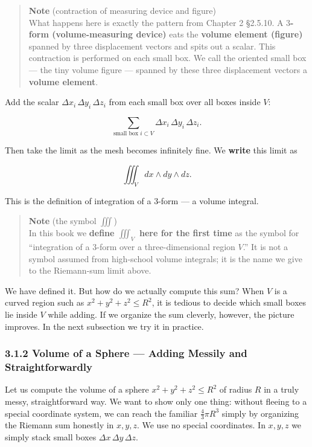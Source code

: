 \begin{quote}
\textbf{Note} (contraction of measuring device and figure)\\
What happens here is exactly the pattern from Chapter 2 §2.5.10. A
\textbf{$3$-form (volume-measuring device)} eats the
\textbf{volume element (figure)} spanned by three displacement vectors
and spits out a scalar. This contraction is performed on each small box.
We call the oriented small box --- the tiny volume figure --- spanned by
these three displacement vectors a \textbf{volume element}.
\end{quote}

Add the scalar \(\Delta x_i\,\Delta y_i\,\Delta z_i\) from each small
box over all boxes inside \(V\):

\[\sum_{\text{small box }i \subset V} \Delta x_i\,\Delta y_i\,\Delta z_i.\]

Then take the limit as the mesh becomes infinitely fine. We
\textbf{write} this limit as

\[\iiint_V dx \wedge dy \wedge dz.\]

This is the definition of integration of a \(3\)-form --- a volume
integral.

\begin{quote}
\textbf{Note} (the symbol \(\iiint\))\\
In this book we \textbf{define $\iiint_V$ here for the first time} as
the symbol for ``integration of a \(3\)-form over a three-dimensional
region \(V\).'' It is not a symbol assumed from high-school volume
integrals; it is the name we give to the Riemann-sum limit above.
\end{quote}

We have defined it. But how do we actually compute this sum? When \(V\)
is a curved region such as \(x^2+y^2+z^2 \le R^2\), it is tedious to
decide which small boxes lie inside \(V\) while adding. If we organize
the sum cleverly, however, the picture improves. In the next subsection
we try it in practice.

\hypertarget{volume-of-a-sphere-adding-messily-and-straightforwardly}{%
\subsubsection{3.1.2 Volume of a Sphere --- Adding Messily and
Straightforwardly}\label{volume-of-a-sphere-adding-messily-and-straightforwardly}}

Let us compute the volume of a sphere \(x^2 + y^2 + z^2 \le R^2\) of
radius \(R\) in a truly messy, straightforward way. We want to show only
one thing: without fleeing to a special coordinate system, we can reach
the familiar \(\frac{4}{3}\pi R^3\) simply by organizing the Riemann sum
honestly in \(x,y,z\). We use no special coordinates. In \(x,y,z\) we
simply stack small boxes \(\Delta x\,\Delta y\,\Delta z\).

